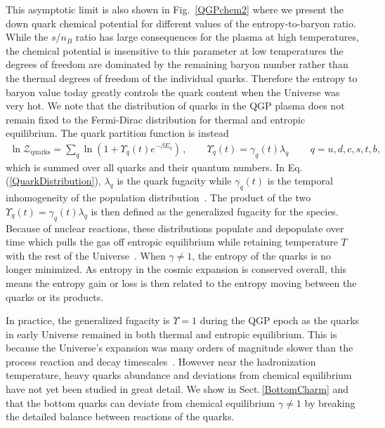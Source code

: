 \documentclass[universe,article,submit,moreauthors,pdftex,a4paper]{Definitions/mdpi}
\newcommand{\req}[1]{Eq.\,(\ref{#1})}
\newcommand*{\rf}[1]{Fig.~{\ref{#1}}}
\newcommand*{\rsec}[1]{Sect.\,{\ref{#1}}}
\begin{document}
This asymptotic limit is also shown in \rf{QGPchem2} where we present the down quark chemical potential for different values of the entropy-to-baryon ratio. While the $s/n_{B}$ ratio has large consequences for the plasma at high temperatures, the chemical potential is insensitive to this parameter at low temperatures the degrees of freedom are dominated by the remaining baryon number rather than the thermal degrees of freedom of the individual quarks. Therefore the entropy to baryon value today greatly controls the quark content when the Universe was very hot. We note that the distribution of quarks in the QGP plasma does not remain fixed to the Fermi-Dirac distribution for thermal and entropic equilibrium. The quark partition function is instead
\begin{align} \label{QuarkDistribution}\ln\mathcal{Z}_{\mathrm{quarks}}=\sum_{q}\ln\left(1+\Upsilon_{q}(t)e^{-\beta E_{q}}\right)\,,\qquad\Upsilon_{q}(t)=\gamma_{q}(t)\lambda_{q}\,\qquad q=u,d,c,s,t,b,
\end{align}
which is summed over all quarks and their quantum numbers. In \req{QuarkDistribution}, $\lambda_{q}$ is the quark fugacity while $\gamma_{q}(t)$ is the temporal inhomogeneity of the population distribution~\cite{Rafelski:2019twp}. The product of the two $\Upsilon_{q}(t)=\gamma_{q}(t)\lambda_{q}$ is then defined as the generalized fugacity for the species. Because of nuclear reactions, these distributions populate and depopulate over time which pulls the gas off entropic equilibrium while retaining temperature $T$ with the rest of the Universe~\cite{Letessier:2002ony}. When $\gamma\neq1$, the entropy of the quarks is no longer minimized. As entropy in the cosmic expansion is conserved overall, this means the entropy gain or loss is then related to the entropy moving between the quarks or its products.

In practice, the generalized fugacity is $\Upsilon=1$  during the QGP epoch as the quarks in early Universe remained in both thermal and entropic equilibrium. This is because the Universe's expansion was many orders of magnitude slower than the process reaction and decay timescales~\cite{Letessier:2002ony}. However near the hadronization temperature, heavy quarks abundance and deviations from chemical equilibrium have not yet been studied in great detail. We show in \rsec{BottomCharm} and~\cite{Yang:2020nne,Yang:2023bot} that the bottom quarks can deviate from chemical equilibrium $\gamma\neq1$ by breaking the detailed balance between reactions of the quarks.
\end{document}
